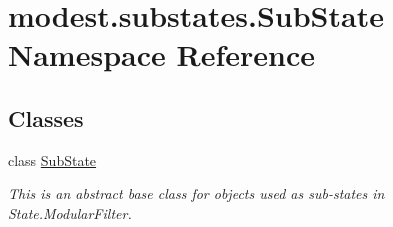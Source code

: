 \hypertarget{namespacemodest_1_1substates_1_1SubState}{}\section{modest.\+substates.\+Sub\+State Namespace Reference}
\label{namespacemodest_1_1substates_1_1SubState}
\subsection*{Classes}
\begin{DoxyCompactItemize}
\item 
class \hyperlink{classmodest_1_1substates_1_1SubState_1_1SubState}{Sub\+State}
\begin{DoxyCompactList}\small\item\em This is an abstract base class for objects used as sub-\/states in State.\+Modular\+Filter. \end{DoxyCompactList}\end{DoxyCompactItemize}
